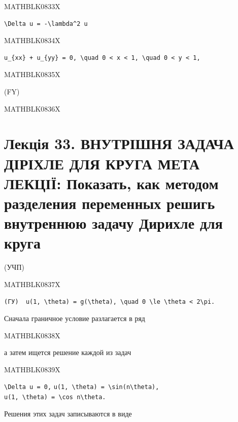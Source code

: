 \documentclass[
  ukrainian,
]{article}
\begin{document}
MATHBLK0833X

\begin{verbatim}
\Delta u = -\lambda^2 u
\end{verbatim}

MATHBLK0834X

\begin{verbatim}
u_{xx} + u_{yy} = 0, \quad 0 < x < 1, \quad 0 < y < 1,
\end{verbatim}

MATHBLK0835X

(FY)

MATHBLK0836X

\section{Лекція 33. ВНУТРІШНЯ ЗАДАЧА ДІРІХЛЕ ДЛЯ КРУГА МЕТА ЛЕКЦІЇ:
Показать, как методом разделения переменных решигь внутреннюю задачу
Дирихле для
круга}\label{ux43bux435ux43aux446ux456ux44f-33.-ux432ux43dux443ux442ux440ux456ux448ux43dux44f-ux437ux430ux434ux430ux447ux430-ux434ux456ux440ux456ux445ux43bux435-ux434ux43bux44f-ux43aux440ux443ux433ux430-ux43cux435ux442ux430-ux43bux435ux43aux446ux456ux457-ux43fux43eux43aux430ux437ux430ux442ux44c-ux43aux430ux43a-ux43cux435ux442ux43eux434ux43eux43c-ux440ux430ux437ux434ux435ux43bux435ux43dux438ux44f-ux43fux435ux440ux435ux43cux435ux43dux43dux44bux445-ux440ux435ux448ux438ux433ux44c-ux432ux43dux443ux442ux440ux435ux43dux43dux44eux44e-ux437ux430ux434ux430ux447ux443-ux434ux438ux440ux438ux445ux43bux435-ux434ux43bux44f-ux43aux440ux443ux433ux430}

(УЧП)

MATHBLK0837X

\texttt{(ГУ)\ \ \textquotesingle{}u(1,\ \textbackslash{}theta)\ =\ g(\textbackslash{}theta),\ \textbackslash{}quad\ 0\ \textbackslash{}le\ \textbackslash{}theta\ \textless{}\ 2\textbackslash{}pi.\textquotesingle{}}

Сначала граничное условие разлагается в ряд

MATHBLK0838X

а затем ищется решение каждой из задач

MATHBLK0839X

\texttt{\textbackslash{}Delta\ u\ =\ 0,}
\texttt{u(1,\ \textbackslash{}theta)\ =\ \textbackslash{}sin(n\textbackslash{}theta),}
\texttt{u(1,\ \textbackslash{}theta)\ =\ \textbackslash{}cos\ n\textbackslash{}theta.}

Решения этих задач записываются в виде
\end{document}
